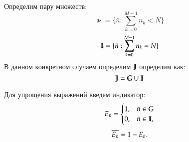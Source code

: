 Определим пару множеств:
\[\Gt = \{\bar{n} : \sum_{k=0}^{M-1}n_k < N\}\]
\[\mathbb{I} = \{\bar{n} : \sum_{k=0}^{M-1}n_k = N\}\]
В данном конкретном случаем определим \(\mathbb{J}\) определим как:
\[\mathbb{J} = \mathbb{G} \cup \mathbb{I}\]

Для упрощения выражений введем индикатор:
\begin{equation*}
    E_{\bar{n}} =
    \begin{cases}
        1, &{\bar{n} \in \mathbb{G} }\\
        0, &{\bar{n} \in \mathbb{I} },
    \end{cases}
\end{equation*}
\begin{equation*}
    \overline{E_{\bar{n}}} = 1 - E_{\bar{n}}.
\end{equation*}


